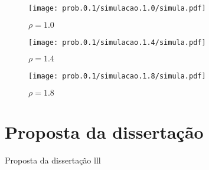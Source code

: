 \documentclass[12pt]{beamer}
\begin{document}
\begin{frame}
\begin{figure}[!ht]
	\centering
		\texttt{[image: prob.0.1/simulacao.1.0/simula.pdf]}
	\begin{center}	
		$\rho = 1.0$
	\end{center}
\end{figure}
\end{frame}

\begin{frame}
\begin{figure}[!ht]
	\centering
		\texttt{[image: prob.0.1/simulacao.1.4/simula.pdf]}
	\begin{center}	
		$\rho = 1.4$
	\end{center}
\end{figure}
\end{frame}

\begin{frame}
\begin{figure}[!ht]
	\centering
		\texttt{[image: prob.0.1/simulacao.1.8/simula.pdf]}
	\begin{center}	
		$\rho = 1.8$
	\end{center}
\end{figure}
\end{frame}


\section{Proposta da disserta\c c\~ao}

\begin{frame}Proposta da disserta\c c\~ao
	lll
\end{frame}
\end{document}
